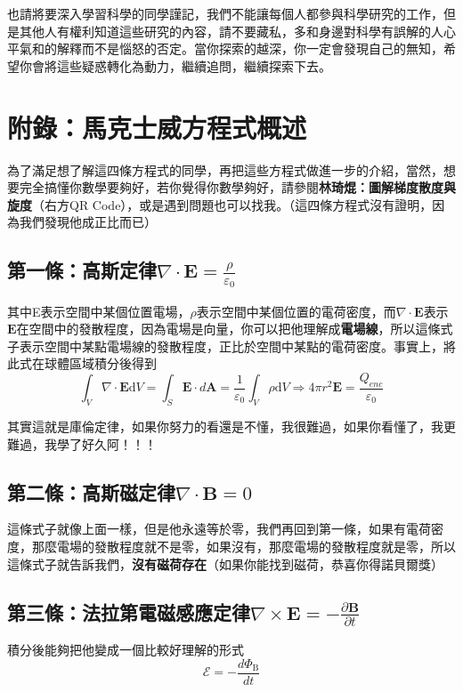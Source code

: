 也請將要深入學習科學的同學謹記，我們不能讓每個人都參與科學研究的工作，但是其他人有權利知道這些研究的內容，請不要藏私，多和身邊對科學有誤解的人心平氣和的解釋而不是惱怒的否定。當你探索的越深，你一定會發現自己的無知，希望你會將這些疑惑轉化為動力，繼續追問，繼續探索下去。

\section{附錄：馬克士威方程式概述} \label{maxwell}
為了滿足想了解這四條方程式的同學，再把這些方程式做進一步的介紹，當然，想要完全搞懂你數學要夠好，若你覺得你數學夠好，請參閱\textbf{林琦焜：圖解梯度散度與旋度}（右方QR Code），或是遇到問題也可以找我。（這四條方程式沒有證明，因為我們發現他成正比而已）

\subsection{第一條：高斯定律\texorpdfstring{$\nabla \cdot \mathbf{E}=\frac{\rho}{\varepsilon_{0}}$}{TEXT}}
其中E表示空間中某個位置電場，$\rho$表示空間中某個位置的電荷密度，而$\nabla \cdot \mathbf{E}$表示$\mathbf{E}$在空間中的發散程度，因為電場是向量，你可以把他理解成\textbf{電場線}，所以這條式子表示空間中某點電場線的發散程度，正比於空間中某點的電荷密度。事實上，將此式在球體區域積分後得到
$$
\int_{V} \nabla \cdot \mathbf{E} \mathrm{d} V=\int_{S} \mathbf{E} \cdot d \mathbf{A}=\frac{1}{\varepsilon_{0}} \int_{V} \rho \mathrm{d} V \Rightarrow 4 \pi r^{2} \mathbf{E}=\frac{Q_{e n c}}{\varepsilon_{0}}
$$

其實這就是庫倫定律，如果你努力的看還是不懂，我很難過，如果你看懂了，我更難過，我學了好久阿！！！

\subsection{第二條：高斯磁定律\texorpdfstring{$\nabla \cdot \mathbf{B}=0$}{TEXT}}
這條式子就像上面一樣，但是他永遠等於零，我們再回到第一條，如果有電荷密度，那麼電場的發散程度就不是零，如果沒有，那麼電場的發散程度就是零，所以這條式子就告訴我們，\textbf{沒有磁荷存在}（如果你能找到磁荷，恭喜你得諾貝爾獎）

\subsection{第三條：法拉第電磁感應定律\texorpdfstring{$\nabla \times \mathbf{E}=-\frac{\partial \mathbf{B}}{\partial t}$}{TEXT}}
積分後能夠把他變成一個比較好理解的形式
$$
\mathcal{E}=-\frac{d \Phi_{\mathrm{B}}}{d t}
$$

